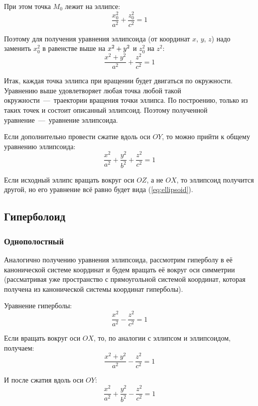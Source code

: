 \documentclass[a4paper,12pt]{article}
\begin{document}
  При этом точка $M_0$ лежит на эллипсе:
  \[
    \frac{x_0^2}{a^2} + \frac{z_0^2}{c^2} = 1
  \]
  
  Поэтому для получения уравнения эллипсоида (от координат $x$, $y$, $z$) надо заменить $x_0^2$ в равенстве выше на $x^2 \hm+ y^2$ и $z_0^2$ на $z^2$:
  \[
    \frac{x^2 + y^2}{a^2} + \frac{z^2}{c^2} = 1
  \]
  
  Итак, каждая точка эллипса при вращении будет двигаться по окружности.
  Уравнению выше удовлетворяет любая точка любой такой окружности~---~траектории вращения точки эллипса.
  По построению, только из таких точек и состоит описанный эллипсоид.
  Поэтому полученной уравнение~---~уравнение эллипсоида.
  
  Если дополнительно провести сжатие вдоль оси $OY$, то можно прийти к общему уравнению эллипсоида:
  \begin{equation}
    \label{eq:ellipsoid}
    \frac{x^2}{a^2} + \frac{y^2}{b^2} + \frac{z^2}{c^2} = 1
  \end{equation}
  
  Если исходный эллипс вращать вокруг оси $OZ$, а не $OX$, то эллипсоид получится другой, но его уравнение всё равно будет вида (\ref{eq:ellipsoid}).  %
  
  
  \subsection{Гиперболоид}
  
  
  \subsubsection{Однополостный}
  
  Аналогично получению уравнения эллипсоида, рассмотрим гиперболу в её канонической системе координат и будем вращать её вокруг оси симметрии (рассматривая уже пространство с прямоугольной системой координат, которая получена из канонической системы координат гиперболы).
  
  Уравнение гиперболы:
  \[
    \frac{x^2}{a^2} - \frac{z^2}{c^2} = 1
  \]
  
  Если вращать вокруг оси $OX$, то, по аналогии с эллипсом и эллипсоидом, получаем:
  \[
    \frac{x^2 + y^2}{a^2} - \frac{z^2}{c^2} = 1
  \]
  
  И после сжатия вдоль оси $OY$:
  \begin{equation}
    \label{eq:hyperboloid1}
    \frac{x^2}{a^2} + \frac{y^2}{b^2} - \frac{z^2}{c^2} = 1
  \end{equation}
  
\end{document}
